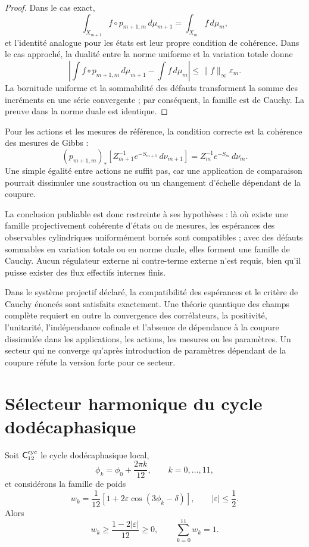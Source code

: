 \begin{proof}
Dans le cas exact,
\[
 \int_{X_{m+1}}f\circ p_{m+1,m}\,d\mu_{m+1}
 =\int_{X_m}f\,d\mu_m,
\]
et l'identité analogue pour les états est leur propre condition de cohérence.
Dans le cas approché, la dualité entre la norme uniforme et la variation
totale donne
\[
 \left|
 \int f\circ p_{m+1,m}\,d\mu_{m+1}
 -\int f\,d\mu_m
 \right|
 \leq \|f\|_\infty\varepsilon_m.
\]
La bornitude uniforme et la sommabilité des défauts transforment la somme des
incréments en une série convergente ; par conséquent, la famille est de Cauchy. La
preuve dans la norme duale est identique.
\end{proof}

Pour les actions et les mesures de référence, la condition correcte est la
cohérence des mesures de Gibbs :
\[
 (p_{m+1,m})_\ast
 \left[
 Z_{m+1}^{-1}e^{-S_{m+1}}\,d\nu_{m+1}
 \right]
 =
 Z_m^{-1}e^{-S_m}\,d\nu_m.
\]
Une simple égalité entre actions ne suffit pas, car une application de comparaison
pourrait dissimuler une soustraction ou un changement d'échelle dépendant de la coupure.

La conclusion publiable est donc restreinte à ses hypothèses :
là où existe une famille projectivement cohérente d'états ou de mesures,
les espérances des observables cylindriques uniformément bornés sont
compatibles ; avec des défauts sommables en variation totale ou en norme duale, elles forment
une famille de Cauchy. Aucun régulateur externe ni contre-terme
externe n'est requis, bien qu'il puisse exister des flux effectifs internes finis.

Dans le système projectif déclaré, la compatibilité
des espérances et le critère de Cauchy énoncés sont satisfaits exactement. Une théorie quantique des
champs complète requiert en outre la
convergence des corrélateurs, la positivité, l'unitarité, l'indépendance
cofinale et l'absence de dépendance à la coupure dissimulée dans les applications, les actions,
les mesures ou les paramètres. Un secteur qui ne converge qu'après introduction de paramètres
dépendant de la coupure réfute la version forte pour ce secteur.

\section{Sélecteur harmonique du cycle dodécaphasique}
\label{sec:selector-armonico-c12}

Soit \(\mathsf C_{12}^{\rm cyc}\) le cycle dodécaphasique local,
\[
 \phi_k=\phi_0+\frac{2\pi k}{12},
 \qquad k=0,\ldots,11,
\]
et considérons la famille de poids
\[
 w_k=\frac1{12}
 \left[1+2\varepsilon\cos(3\phi_k-\delta)\right],
 \qquad |\varepsilon|\leq\frac12.
\]
Alors
\[
 w_k\geq\frac{1-2|\varepsilon|}{12}\geq0,
 \qquad
 \sum_{k=0}^{11}w_k=1.
\]

